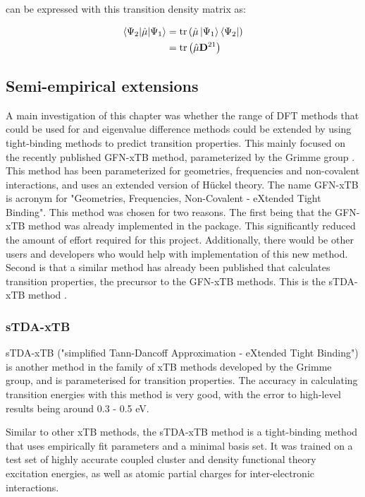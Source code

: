 can be expressed with this transition density matrix as:

\begin{equation}
\begin{split}    
\braket{\Psi_2|\hat{\mathbf{\mu}}|\Psi_1} &= \text{tr}\left(\hat{\mathbf{\mu}} \ket{\Psi_1} \bra{\Psi_2} \right) \\
&= \text{tr}\left( \hat{\mathbf{\mu}} \mathbf{D}^{21}\right)
\end{split}
\end{equation}

\subsection{Semi-empirical extensions}
\label{subsec:dscf_xtb}
A main investigation of this chapter was whether the range of DFT methods
that could be used for \dscf and eigenvalue difference methods could be extended 
by using tight-binding methods to predict transition properties.
This mainly focused on the recently published GFN-xTB method, parameterized by
the Grimme group \cite{Grimme2017}. This method has been parameterized for geometries,
frequencies and non-covalent interactions, and uses an extended version of H{\"u}ckel theory.
The name GFN-xTB is acronym for "Geometries, Frequencies, Non-Covalent - eXtended Tight Binding".
This method was chosen for two reasons. The first being that the GFN-xTB method was
already implemented in the  package. This significantly reduced the
amount of effort required for this project. Additionally, there would be other
users and developers who would help with implementation of this new method.
Second is that a similar method has already been published that calculates
transition properties, the precursor to the GFN-xTB methods. This is the sTDA-xTB
method \cite{Grimme2016}.

\subsubsection{sTDA-xTB}
\label{subsubsec:stda_xtb}
sTDA-xTB ("simplified Tann-Dancoff Approximation - eXtended Tight Binding") is another
method in the family of xTB methods developed by the Grimme group, and is parameterised
for transition properties. The accuracy in calculating transition energies with this
method is very good, with the error to high-level results being around 0.3 - 0.5 eV.

Similar to other xTB methods, the sTDA-xTB method is a tight-binding method that
uses empirically fit parameters and a minimal basis set. It was trained on a
test set of highly accurate coupled cluster and density functional theory
excitation energies, as well as atomic partial charges for inter-electronic interactions.

